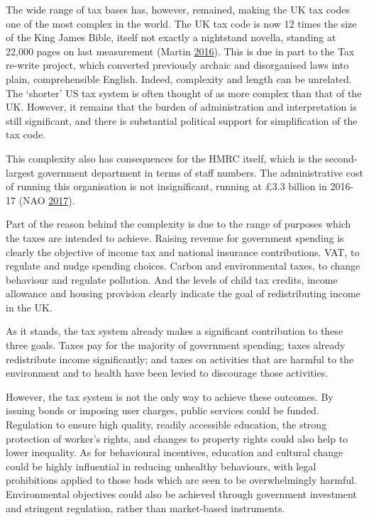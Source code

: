 \documentclass[]{article}
\begin{document}
The wide range of tax bases has, however, remained, making the UK tax
codes one of the most complex in the world. The UK tax code is now 12
times the size of the King James Bible, itself not exactly a nightstand
novella, standing at 22,000 pages on last measurement (Martin
\protect\hyperlink{ref-Martin}{2016}). This is due in part to the Tax
re-write project, which converted previously archaic and disorganised
laws into plain, comprehensible English. Indeed, complexity and length
can be unrelated. The `shorter' US tax system is often thought of as
more complex than that of the UK. However, it remains that the burden of
administration and interpretation is still significant, and there is
substantial political support for simplification of the tax code.

This complexity also has consequences for the HMRC itself, which is the
second-largest government department in terms of staff numbers. The
administrative cost of running this organisation is not insignificant,
running at £3.3 billion in 2016-17 (NAO
\protect\hyperlink{ref-NAO2017}{2017}).

Part of the reason behind the complexity is due to the range of purposes
which the taxes are intended to achieve. Raising revenue for government
spending is clearly the objective of income tax and national insurance
contributions. VAT, to regulate and nudge spending choices. Carbon and
environmental taxes, to change behaviour and regulate pollution. And the
levels of child tax credits, income allowance and housing provision
clearly indicate the goal of redistributing income in the UK.

As it stands, the tax system already makes a significant contribution to
these three goals. Taxes pay for the majority of government spending;
taxes already redistribute income significantly; and taxes on activities
that are harmful to the environment and to health have been levied to
discourage those activities.

However, the tax system is not the only way to achieve these outcomes.
By issuing bonds or imposing user charges, public services could be
funded. Regulation to ensure high quality, readily accessible education,
the strong protection of worker's rights, and changes to property rights
could also help to lower inequality. As for behavioural incentives,
education and cultural change could be highly influential in reducing
unhealthy behaviours, with legal prohibitions applied to those bads
which are seen to be overwhelmingly harmful. Environmental objectives
could also be achieved through government investment and stringent
regulation, rather than market-based instruments.
\end{document}
